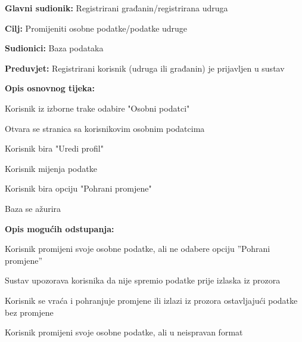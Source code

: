 				\noindent {}
			\begin{packed_item}
				
				\item \textbf{Glavni sudionik:} Registrirani građanin/registrirana udruga
				\item  \textbf{Cilj:} Promijeniti osobne podatke/podatke udruge
				\item  \textbf{Sudionici:} Baza podataka
				\item  \textbf{Preduvjet:} Registrirani korisnik (udruga ili građanin) je prijavljen u sustav
				\item  \textbf{Opis osnovnog tijeka:}
				
				\item[] \begin{packed_enum}
					\item Korisnik iz izborne trake odabire "Osobni podatci"
					\item Otvara se stranica sa korisnikovim osobnim podatcima
					\item Korisnik bira "Uredi profil"
					\item Korisnik mijenja podatke
					\item Korisnik bira opciju "Pohrani promjene"
					\item Baza se ažurira
				\end{packed_enum}
				
				\item  \textbf{Opis mogućih odstupanja:}
				
				\item[] \begin{packed_item}
					
					\item [4.a]  Korisnik promijeni svoje osobne podatke, ali ne odabere opciju ”Pohrani
					promjene”
					\item[] \begin{packed_enum}
						
						\item Sustav upozorava korisnika da nije spremio podatke prije izlaska iz prozora
						\item Korisnik se vraća i pohranjuje promjene ili izlazi iz prozora ostavljajući podatke bez promjene
					\end{packed_enum}
				
					\item [4.b]  Korisnik promijeni svoje osobne podatke, ali u neispravan format
					\item[] \begin{packed_enum}
						

\end{packed_enum}
\end{packed_item}
\end{packed_item}
